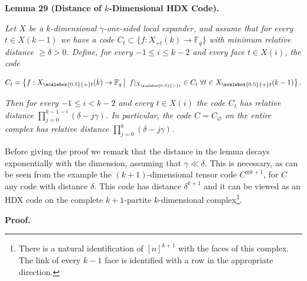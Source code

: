\documentclass[10pt,a4paper]{article}
\begin{document}


\par\medskip\noindent\textbf{
\textbf{Lemma 29}\textbf{ }(Distance of $k$-Dimensional HDX Code)\textbf{.}
}\par



\emph{Let $X$ be a $k$-dimensional $\gamma$-one-sided local expander, and assume that for every $t\in X(k-1)$ we have a code $C_{t}\subset\{f:X_{+t}(k)\rightarrow\mathbb{F}_{q}\}$ with minimum relative distance $\geq\delta>0$. Define, for every $-1\leq i\leq k-2$ and every face $t\in X(i)$, the code}\par


\[\begin{gathered}
C_{t}=\left\{f:{X}_{\scalebox{0.5}{+}t}(k)\to\mathbb{F}_{q}\left|\;\vphantom{f:{X}_{\scalebox{0.5}{+}t}(k)\to\mathbb{F}_{q}f|_{{X}_{\scalebox{0.5}{+}t}}\in C_{t}\;\forall t\in{X}_{\scalebox{0.5}{+}t}(k-1)}\right.f|_{{X}_{\scalebox{0.5}{+}t}}\in C_{t}\;\forall t\in{X}_{\scalebox{0.5}{+}t}(k-1)\right\}.
\end{gathered}\]


\emph{Then for every $-1\leq i<k-2$ and every $t\in X(i)$ the code $C_{t}$ has relative distance $\prod_{j=0}^{k-1-i}(\delta-j\gamma)$. In particular, the code $C=C_{\varnothing}$ on the entire complex has relative distance $\prod_{j=0}^{k}(\delta-j\gamma)$.}\par






Before giving the proof we remark that the distance in the lemma decays exponentially with the dimension, assuming that $\gamma\ll\delta$. This is necessary, as can be seen from the example the $(k+1)$-dimensional tensor code $C^{\otimes k+1}$, for $C$ any code with distance $\delta$. This code has distance $\delta^{k+1}$ and it can be viewed as an HDX code on the complete $k+1$-partite $k$-dimensional complex\footnote{There is a natural identification of $[n]^{k+1}$ with the faces of this complex. The link of every $k-1$ face is identified with a row in the appropriate direction.}.\par





\par\medskip\noindent\textbf{Proof.}\par
\end{document}
